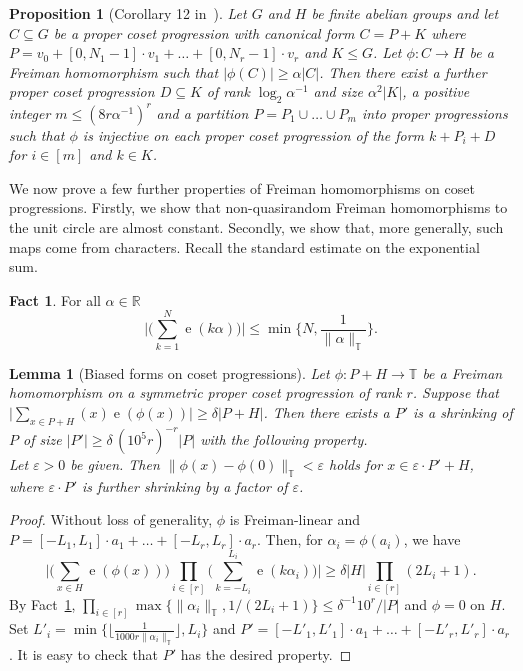 \documentclass[a4paper,11pt]{article}
\numberwithin{theorem}{section}
\newtheorem{lemma}[theorem]{Lemma}
\newtheorem{proposition}[theorem]{Proposition}
\theoremstyle{definition}
\newtheorem{fact}[theorem]{Fact}
\newcommand{\on}[1]{
	\operatorname{#1}
}
\begin{document}
\begin{proposition}[Corollary 12 in~\cite{generalBilBog}]\label{almostinjectivitycor}Let $G$ and $H$ be finite abelian groups and let $C \subseteq G$ be a proper coset progression with canonical form $C = P + K$ where $P = v_0 + [0, N_1 - 1] \cdot v_1 + \dots + [0, N_r - 1] \cdot v_r$ and $K \leq G$. Let $\phi \colon C \to H$ be a Freiman homomorphism such that $|\phi(C)| \geq \alpha |C|$. Then there exist a further proper coset progression $D \subseteq K$ of rank $\log_2 \alpha^{-1}$ and size $\alpha^2 |K|$, a positive integer $m \leq (8r \alpha^{-1})^r$ and a partition $P = P_1 \cup \dots \cup P_m$ into proper progressions such that $\phi$ is injective on each proper coset progression of the form $k + P_i + D$ for $i \in [m]$ and $k \in K$.\end{proposition}

We now prove a few further properties of Freiman homomorphisms on coset progressions. Firstly, we show that non-quasirandom Freiman homomorphisms to the unit circle are almost constant. Secondly, we show that, more generally, such maps come from characters. Recall the standard estimate on the exponential sum.

\begin{fact}\label{stdexpsumest} For all $\alpha \in \mathbb{R}$
    \[\Big|\Big(\sum_{k = 1}^{N} \on{e}(k \alpha)\Big)\Big| \leq \min\Big\{N, \frac{1}{\|\alpha\|_{\mathbb{T}}}\Big\}.\]
\end{fact}

\begin{lemma}[Biased forms on coset progressions]\label{biasedformsprog}
    Let $\phi : P + H \to \mathbb{T}$ be a Freiman homomorphism on a symmetric proper coset progression of rank $r$. Suppose that $\Big|\sum_{x \in P + H}(x) \on{e}(\phi(x)) \Big| \geq \delta |P + H|$. Then there exists a $P'$ is a shrinking of $P$ of size $|P'| \geq \delta \, (10^{5}r)^{-r}|P|$ with the following property.\\
    \indent Let $\varepsilon > 0$ be given. Then $\|\phi(x) - \phi(0)\|_{\mathbb{T}} < \varepsilon$ holds for $x \in \varepsilon \cdot P' + H$, where $\varepsilon \cdot P'$ is further shrinking by a factor of $\varepsilon$.
\end{lemma}

\begin{proof}
    Without loss of generality, $\phi$ is Freiman-linear and $P = [-L_1, L_1] \cdot a_1 + \dots + [-L_r, L_r] \cdot a_r$. Then, for $\alpha_i = \phi(a_i)$, we have
    \[\Big|\Big(\sum_{x \in H} \on{e}(\phi(x))\Big)\prod_{i \in [r]} \Big(\sum_{k = -L_i}^{L_i} \on{e}(k \alpha_i)\Big)\Big| \geq \delta |H| \prod_{i \in [r]} (2L_i + 1).\]
    By Fact~\ref{stdexpsumest}, $\prod_{i \in [r]} \max\{\|\alpha_i\|_{\mathbb{T}}, 1/(2L_i+1)\} \leq \delta^{-1} 10^r / |P|$ and $\phi = 0$ on $H$. Set $L'_i = \on{min}\Big\{\Big\lfloor\frac{1}{1000 r \|\alpha_i\|_{\mathbb{T}}}\Big\rfloor, L_i\Big\}$ and $P' = [-L'_1, L'_1] \cdot a_1 + \dots + [-L'_r, L'_r] \cdot a_r$. It is easy to check that $P'$ has the desired property.
\end{proof}
\end{document}
